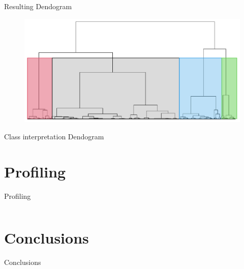 \begin{frame}{Resulting Dendogram}
\begin{figure}[H]
    \centering
    \includegraphics[width=0.8\linewidth]{cluster-dendo-h3-color}
    \label{fig:dendogram-final}
\end{figure}
\end{frame}


\begin{frame}{Class interpretation Dendogram}
\end{frame}

\section{Profiling}
\begin{frame}{Profiling}

\begin{columns}
\begin{column}{0.5\textwidth}
\end{column}
\begin{column}{0.5\textwidth}  %
\end{column}
\end{columns}

\end{frame}



\section{Conclusions}
\begin{frame}{Conclusions}
\end{frame}

